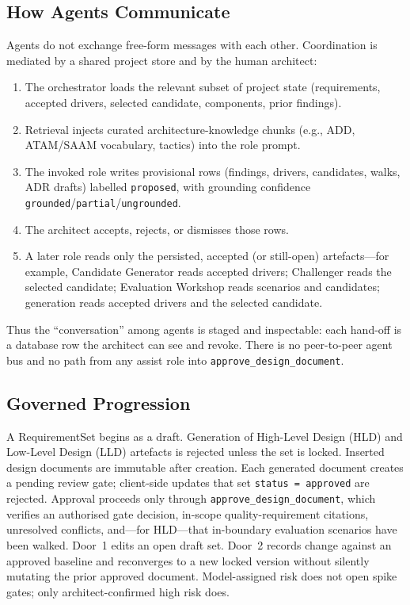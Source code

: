 \documentclass[conference]{IEEEtran}
\begin{document}
\subsection{How Agents Communicate}
Agents do not exchange free-form messages with each other.
Coordination is mediated by a shared project store and by the human architect:
\begin{enumerate}
\item The orchestrator loads the relevant subset of project state (requirements, accepted drivers, selected candidate, components, prior findings).
\item Retrieval injects curated architecture-knowledge chunks (e.g., ADD, ATAM/SAAM vocabulary, tactics) into the role prompt.
\item The invoked role writes provisional rows (findings, drivers, candidates, walks, ADR drafts) labelled \texttt{proposed}, with grounding confidence \texttt{grounded}/\texttt{partial}/\texttt{ungrounded}.
\item The architect accepts, rejects, or dismisses those rows.
\item A later role reads only the persisted, accepted (or still-open) artefacts---for example, Candidate Generator reads accepted drivers; Challenger reads the selected candidate; Evaluation Workshop reads scenarios and candidates; generation reads accepted drivers and the selected candidate.
\end{enumerate}
Thus the ``conversation'' among agents is staged and inspectable: each hand-off is a database row the architect can see and revoke.
There is no peer-to-peer agent bus and no path from any assist role into \texttt{approve\_design\_document}.

\subsection{Governed Progression}
A RequirementSet begins as a draft.
Generation of High-Level Design (HLD) and Low-Level Design (LLD) artefacts is rejected unless the set is locked.
Inserted design documents are immutable after creation.
Each generated document creates a pending review gate; client-side updates that set \texttt{status = approved} are rejected.
Approval proceeds only through \texttt{approve\_design\_document}, which verifies an authorised gate decision, in-scope quality-requirement citations, unresolved conflicts, and---for HLD---that in-boundary evaluation scenarios have been walked.
Door~1 edits an open draft set.
Door~2 records change against an approved baseline and reconverges to a new locked version without silently mutating the prior approved document.
Model-assigned risk does not open spike gates; only architect-confirmed high risk does.
\end{document}
